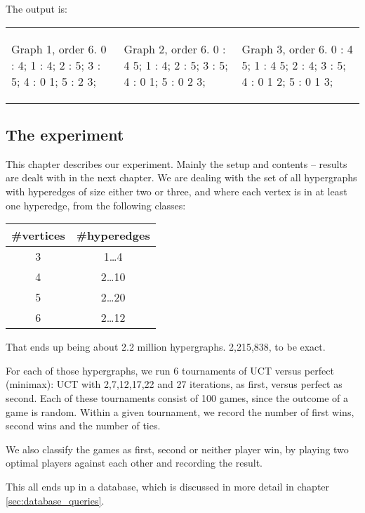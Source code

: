 The output is:

\begin{tabular}{|p{1.5in} | p{1.5in} | p{1.5in} |}
\begin{minipage}{1.5in}
\begin{datalisting}
Graph 1, order 6.
  0 : 4;
  1 : 4;
  2 : 5;
  3 : 5;
  4 : 0 1;
  5 : 2 3;

\end{datalisting}
\end{minipage}
&
\begin{minipage}{1.5in}
\begin{datalisting}
Graph 2, order 6.
  0 : 4 5;
  1 : 4;
  2 : 5;
  3 : 5;
  4 : 0 1;
  5 : 0 2 3;
\end{datalisting}
\end{minipage}
&
\begin{minipage}{1.5in}
\begin{datalisting}
Graph 3, order 6.
  0 : 4 5;
  1 : 4 5;
  2 : 4;
  3 : 5;
  4 : 0 1 2;
  5 : 0 1 3;
\end{datalisting}
\end{minipage}
\\
\end{tabular}


\subsection{The experiment}
\label{sec:experiment1}

This chapter describes our experiment. Mainly the setup and contents -- results are dealt with in the next chapter.
We are dealing with the set of all hypergraphs with hyperedges of size either two or three, and where each vertex is in at least one hyperedge, from the following classes:

\begin{tabular}{ c | c }
\#vertices & \#hyperedges \\ \hline
3&1\ldots4 \\ \hline
4&2\ldots10 \\ \hline
5&2\ldots20 \\ \hline
6&2\ldots12 \\ \hline
\end{tabular}

That ends up being about 2.2 million hypergraphs. 2,215,838, to be exact.

For each of those hypergraphs, we run 6 tournaments of UCT versus perfect (minimax): UCT with 2,7,12,17,22 and 27 iterations, as first, versus perfect as second.
Each of these tournaments consist of 100 games, since the outcome of a game is random. Within a given tournament, we record the number of first wins, second wins and the number of ties.

We also classify the games as first, second or neither player win, by playing two optimal players against each other and recording the result.

This all ends up in a database, which is discussed in more detail in chapter \ref{sec:database_queries}.
